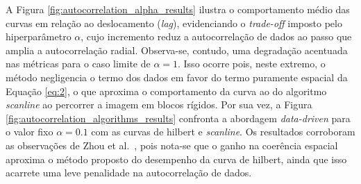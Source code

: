 \documentclass[12pt]{article}
\begin{document}


A Figura \ref{fig:autocorrelation_alpha_results} ilustra o comportamento médio das curvas em relação ao
deslocamento (\textit{lag}), evidenciando o \textit{trade-off} imposto pelo hiperparâmetro $\alpha$, cujo
incremento reduz a autocorrelação de dados ao passo que amplia a autocorrelação radial. Observa-se, contudo,
uma degradação acentuada nas métricas para o caso limite de $\alpha = 1$. Isso ocorre pois, neste extremo, o
método negligencia o termo dos dados em favor do termo puramente espacial da Equação \ref{eq:2}, o que
aproxima o comportamento da curva ao do algoritmo \textit{scanline} ao percorrer a imagem em blocos rígidos.
Por sua vez, a Figura \ref{fig:autocorrelation_algorithms_results} confronta a abordagem \textit{data-driven}
para o valor fixo $\alpha = 0.1$ com as curvas de hilbert e \textit{scanline}. Os resultados
corroboram as observações de Zhou et al.~\cite{zhou:20}, pois nota-se que o ganho na coerência espacial
aproxima o método proposto do desempenho da curva de hilbert, ainda que isso acarrete uma leve penalidade
na autocorrelação de dados.
\end{document}
